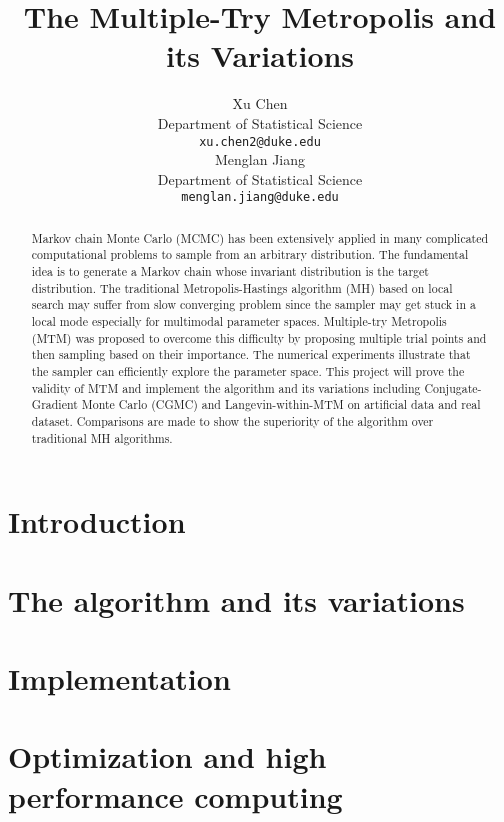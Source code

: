 \documentclass{article} %
\title{The Multiple-Try Metropolis and its Variations}
\author{
Xu Chen\\
Department of Statistical Science\\
\texttt{xu.chen2@duke.edu} \\
\And
Menglan Jiang\\
Department of Statistical Science\\
\texttt{menglan.jiang@duke.edu}
}
\begin{document}
\maketitle

\begin{abstract}
Markov chain Monte Carlo (MCMC) has been extensively applied in many complicated computational problems to sample from an arbitrary distribution. The fundamental idea is to generate a Markov chain whose invariant distribution is the target distribution. The traditional Metropolis-Hastings algorithm (MH) based on local search may suffer from slow converging problem since the sampler may get stuck in a local mode especially for multimodal parameter spaces. Multiple-try Metropolis (MTM) was proposed to overcome this difficulty by proposing multiple trial points and then sampling based on their importance. The numerical experiments illustrate that the sampler can efficiently explore the parameter space. This project will prove the validity of MTM and implement the algorithm and its variations including Conjugate-Gradient Monte Carlo (CGMC) and Langevin-within-MTM on artificial data and real dataset. Comparisons are made to show the superiority of the algorithm over traditional MH algorithms.
\end{abstract}

\section{Introduction}

\subsection{}

\subsection{}

\section{The algorithm and its variations}


\section{Implementation}



\section{Optimization and high performance computing}
\end{document}
